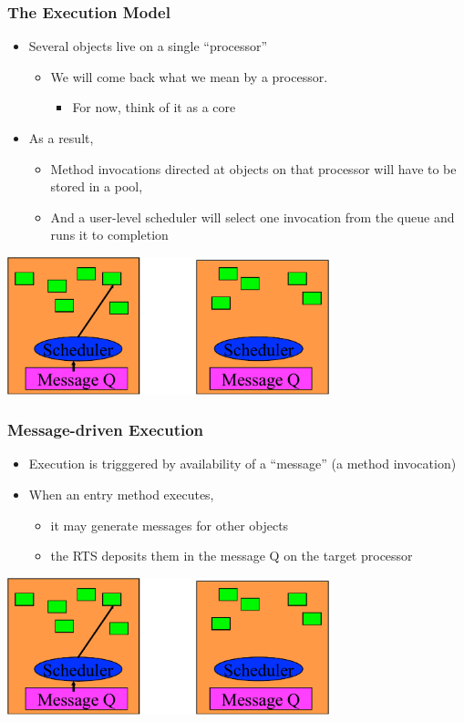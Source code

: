 \begin{frame}[t]
\frametitle{The Execution Model}
  \begin{itemize}
    \item Several objects live on a single ``processor''
    \begin{itemize}
      \item We will come back what we mean by a processor.
      \begin{itemize}
        \item For now, think of it as a core
      \end{itemize}
    \end{itemize}
  \pause
  \item As a result, 
    \begin{itemize}
      \item Method invocations directed at objects on that processor will have to be stored in a pool,
      \pause
      \item And a user-level scheduler will select one invocation from the queue and runs it to completion
    \end{itemize}
  \end{itemize}
  \begin{center} \includegraphics[width=0.7\textwidth]{figures/scheduler} \end{center}
\end{frame}

\begin{frame}[t]
\frametitle{Message-driven Execution}
  \begin{itemize}
    \item Execution is trigggered by availability of a ``message'' (a method invocation)
    \pause
    \item When an entry method executes, 
    \begin{itemize}
      \item it may generate messages for other objects
      \item the RTS deposits them in the message Q on the target processor
    \end{itemize}
  \end{itemize}
  \begin{center} \includegraphics[width=0.7\textwidth]{figures/scheduler} \end{center}
\end{frame}


